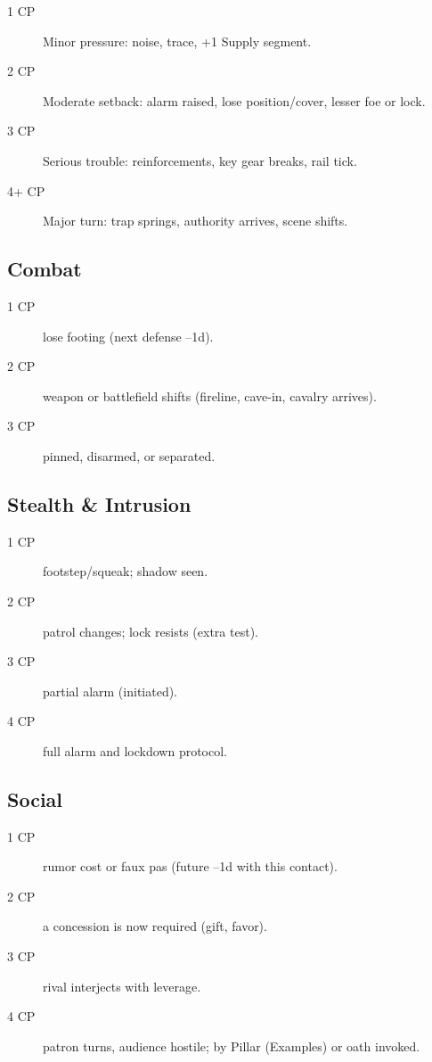 \begin{description}
\item[1 CP] Minor pressure: noise, trace, +1 Supply segment.
\item[2 CP] Moderate setback: alarm raised, lose position/cover, lesser foe or lock.
\item[3 CP] Serious trouble: reinforcements, key gear breaks, rail tick.
\item[4+ CP] Major turn: trap springs, authority arrives, scene shifts.
\end{description}

\subsection{Combat}

\begin{description}
\item[1 CP] lose footing (next defense --1d).
\item[2 CP] weapon or battlefield shifts (fireline, cave-in, cavalry arrives).
\item[3 CP] pinned, disarmed, or separated.
\end{description}

\subsection{Stealth \& Intrusion}

\begin{description}
\item[1 CP] footstep/squeak; shadow seen.
\item[2 CP] patrol changes; lock resists (extra test).
\item[3 CP] partial alarm (initiated).
\item[4 CP] full alarm and lockdown protocol.
\end{description}

\subsection{Social}

\begin{description}
\item[1 CP] rumor cost or faux pas (future --1d with this contact).
\item[2 CP] a concession is now required (gift, favor).
\item[3 CP] rival interjects with leverage.
\item[4 CP] patron turns, audience hostile; by Pillar (Examples) or oath invoked.
\end{description}

